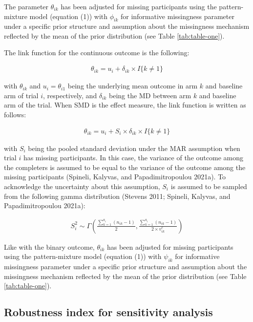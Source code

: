 The parameter \(\theta_{ik}\) has been adjusted for missing participants using the pattern-mixture model (equation (1)) with \(\phi_{ik}\) for informative missingness parameter under a specific prior structure and assumption about the missingness mechanism reflected by the mean of the prior distribution (see Table \ref{tab:table-one}).

The link function for the continuous outcome is the following:

\[\begin{aligned}
\theta_{ik} = u_{i} + \delta_{ik} \times I\{k \ne 1\}      
\end{aligned}\]

with \(\theta_{ik}\) and \(u_{i} = \theta_{i1}\) being the underlying mean outcome in arm \(k\) and baseline arm of trial \(i\), respectively, and \(\delta_{ik}\) being the MD between arm \(k\) and baseline arm of the trial. When SMD is the effect measure, the link function is written as follows:

\[\begin{aligned}
\theta_{ik} = u_{i} + S_{i} \times \delta_{ik} \times I\{k \ne 1\}      
\end{aligned}\]

with \(S_{i}\) being the pooled standard deviation under the MAR assumption when trial \(i\) has missing participants. In this case, the variance of the outcome among the completers is assumed to be equal to the variance of the outcome among the missing participants (Spineli, Kalyvas, and Papadimitropoulou 2021a). To acknowledge the uncertainty about this assumption, \(S_{i}\) is assumed to be sampled from the following gamma distribution (Stevens 2011; Spineli, Kalyvas, and Papadimitropoulou 2021a):

\[\begin{aligned}
S^{2}_{i} \sim \Gamma\left(\frac{\sum_{k=1}^{a_{i}}(n_{ik} - 1)}{2}, \frac{\sum_{k=1}^{a_{i}}(n_{ik} - 1)}{2 \times v^{c}_{ik}}\right)  
\end{aligned}\]

Like with the binary outcome, \(\theta_{ik}\) has been adjusted for missing participants using the pattern-mixture model (equation (1)) with \(\psi_{ik}\) for informative missingness parameter under a specific prior structure and assumption about the missingness mechanism reflected by the mean of the prior distribution (see Table \ref{tab:table-one}).

\hypertarget{robustness-index-for-sensitivity-analysis}{%
\subsection{Robustness index for sensitivity analysis}\label{robustness-index-for-sensitivity-analysis}}


